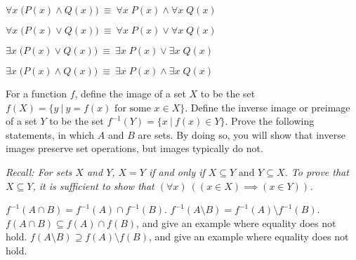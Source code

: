 \documentclass[11pt]{article}
\begin{document}
\begin{Parts}
    \Part $\forall x \; \bigl( P(x) \wedge Q(x) \bigr)~\equiv~\forall x \; P(x) \wedge \forall x \; Q(x)$
    
    \Part $\forall x \; \bigl( P(x) \vee Q(x) \bigr)~\equiv~\forall x \; P(x) \vee \forall x \; Q(x)$
    
    \Part $\exists x \; \bigl( P(x) \vee Q(x) \bigr)~\equiv~\exists x \; P(x) \vee \exists x \; Q(x)$
    
    \Part $\exists x \; \bigl( P(x) \wedge Q(x) \bigr)~\equiv~\exists x \; P(x) \wedge \exists x \; Q(x)$
    
\end{Parts}


For a function $f$, define the image of a set $X$ to be the set $f(X) = \{y~|~y = f(x) \text{ for some } x \in X\}$. Define the inverse image or preimage of a set $Y$ to be the set $f^{-1}(Y) = \{x~|~f(x) \in Y\}$. Prove the following statements, in which $A$ and $B$ are sets. By doing so, you will show that inverse images preserve set operations, but images typically do not.

\textit{Recall: For sets $X$ and $Y$, $X=Y$ if and only if $X \subseteq Y \text{ and } Y \subseteq X$. To prove that $X \subseteq Y$, it is sufficient to show that $(\forall x)~((x \in X) \implies (x \in Y))$.}

\begin{Parts}
    \Part $f^{-1}(A \cap B) = f^{-1}(A) \cap f^{-1}(B)$.
    \Part $f^{-1}(A \setminus B) = f^{-1}(A) \setminus f^{-1}(B)$.
    \Part $f(A \cap B) \subseteq f(A) \cap f(B)$, and give an example where equality does not hold.
    \Part $f(A \setminus B) \supseteq f(A) \setminus f(B)$, and give an example where equality does not hold.
\end{Parts}
\end{document}
